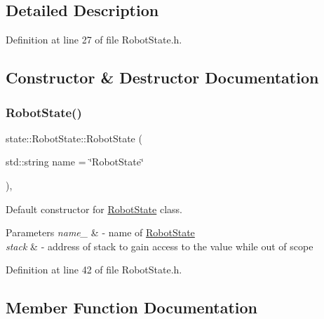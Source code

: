 \subsection{Detailed Description}


Definition at line 27 of file Robot\+State.\+h.



\subsection{Constructor \& Destructor Documentation}
\mbox{\label{classstate_1_1_robot_state_a7e7996ffa8c255402453c158a975ad5e}} 
\subsubsection{\texorpdfstring{RobotState()}{RobotState()}}
{\footnotesize\ttfamily state\+::\+Robot\+State\+::\+Robot\+State (\begin{DoxyParamCaption}\item[{std\+::string}]{name = {\ttfamily \char`\"{}RobotState\char`\"{}} }\end{DoxyParamCaption})\hspace{0.3cm}{\ttfamily [inline]}, {\ttfamily [explicit]}}



Default constructor for \mbox{\hyperlink{classstate_1_1_robot_state}{Robot\+State}} class. 


\begin{DoxyParams}{Parameters}
{\em name\+\_\+} & -\/ name of \mbox{\hyperlink{classstate_1_1_robot_state}{Robot\+State}} \\
\hline
{\em stack} & -\/ address of stack to gain access to the value while out of scope \\
\hline
\end{DoxyParams}


Definition at line 42 of file Robot\+State.\+h.



\subsection{Member Function Documentation}
\mbox{\label{classstate_1_1_robot_state_a27cf3f1f71159bf37f1ea7c0597837dc}} 
